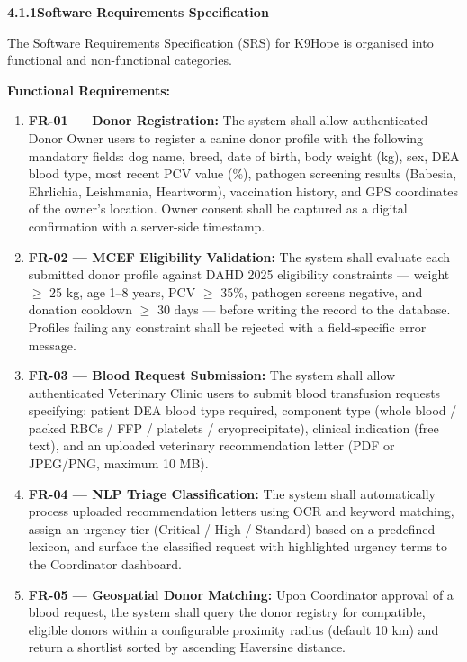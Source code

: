 \documentclass[12pt,a4paper]{article}
\begin{document}
\vspace{1.2em}
\noindent\textbf{4.1.1\quad Software Requirements Specification}
\vspace{0.5em}

\noindent The Software Requirements Specification (SRS) for K9Hope is organised into functional and non-functional categories.

\noindent\textbf{Functional Requirements:}

\begin{enumerate}[leftmargin=1.8em, itemsep=0.4em]
    \item \textbf{FR-01 — Donor Registration:} The system shall allow authenticated Donor Owner users to register a canine donor profile with the following mandatory fields: dog name, breed, date of birth, body weight (kg), sex, DEA blood type, most recent PCV value (\%), pathogen screening results (Babesia, Ehrlichia, Leishmania, Heartworm), vaccination history, and GPS coordinates of the owner's location. Owner consent shall be captured as a digital confirmation with a server-side timestamp.
    \item \textbf{FR-02 — MCEF Eligibility Validation:} The system shall evaluate each submitted donor profile against DAHD 2025 eligibility constraints — weight $\geq$ 25 kg, age 1--8 years, PCV $\geq$ 35\%, pathogen screens negative, and donation cooldown $\geq$ 30 days — before writing the record to the database. Profiles failing any constraint shall be rejected with a field-specific error message.
    \item \textbf{FR-03 — Blood Request Submission:} The system shall allow authenticated Veterinary Clinic users to submit blood transfusion requests specifying: patient DEA blood type required, component type (whole blood / packed RBCs / FFP / platelets / cryoprecipitate), clinical indication (free text), and an uploaded veterinary recommendation letter (PDF or JPEG/PNG, maximum 10 MB).
    \item \textbf{FR-04 — NLP Triage Classification:} The system shall automatically process uploaded recommendation letters using OCR and keyword matching, assign an urgency tier (Critical / High / Standard) based on a predefined lexicon, and surface the classified request with highlighted urgency terms to the Coordinator dashboard.
    \item \textbf{FR-05 — Geospatial Donor Matching:} Upon Coordinator approval of a blood request, the system shall query the donor registry for compatible, eligible donors within a configurable proximity radius (default 10 km) and return a shortlist sorted by ascending Haversine distance.

\end{enumerate}
\end{document}
